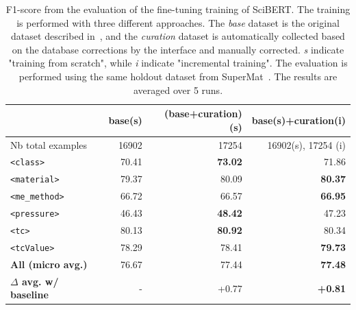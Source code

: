 \documentclass[]{interact}
\theoremstyle{plain} %
\theoremstyle{definition}
\theoremstyle{remark}
\begin{document}
\begin{table}[ht]
\centering\small
\caption{F1-score from the evaluation of the fine-tuning training of SciBERT. The training is performed with three different approaches. 
The \emph{base} dataset is the original dataset described in~\cite{lfoppiano2023automatic}, and the \emph{curation} dataset is automatically collected based on the database corrections by the interface and manually corrected. \textit{s} indicate "training from scratch", while \textit{i} indicate "incremental training". 
The evaluation is performed using the same holdout dataset from SuperMat~\cite{foppiano2021supermat}. 
The results are averaged over 5 runs. }
\begin{tabular}{lrrr}
\toprule
& \textbf{base(s)} & \textbf{(base+curation)(s)} & \textbf{base(s)+curation(i)} \\ 
\midrule
Nb total examples & 16902 & 17254 & 16902(s), 17254 (i)\\ 
\midrule
\texttt{<class>}        & 70.41         & \textbf{73.02}         & 71.86 \\ 
\texttt{<material>}     & 79.37         & 80.09         & \textbf{80.37} \\ 
\texttt{<me\_method>}   & 66.72         & 66.57         & \textbf{66.95} \\ 
\texttt{<pressure>}     & 46.43         & \textbf{48.42}         & 47.23 \\ 
\texttt{<tc>}           & 80.13         & \textbf{80.92}         & 80.34 \\ 
\texttt{<tcValue>}      & 78.29         & 78.41         & \textbf{79.73} \\ 
\midrule
\textbf{All (micro avg.)} & 76.67       & 77.44         & \textbf{77.48} \\ 
\midrule
\textbf{$\Delta$ avg. w/ baseline}& -   & +0.77     & \textbf{+0.81} \\ 
\bottomrule
\end{tabular}
\label{tab:evaluation-curation-training2}
\end{table}
\end{document}
